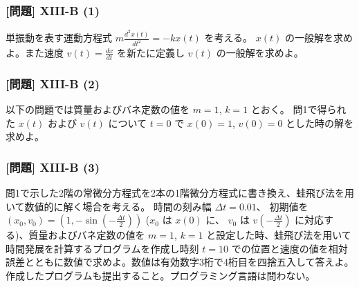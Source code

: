 \documentclass[dvipdfmx,aspectratio=169,20pt]{beamer}
\newcommand{\myfontsetting}[3]{{\fontsize{#1}{#2}\selectfont #3}}
\begin{document}
\graphicspath{{figs/}}

\begin{frame}
\frametitle{[問題] X\hspace{-.1em}I\hspace{-.1em}I\hspace{-.1em}I-B (1)}
\myfontsetting{18pt}{18pt}{
単振動を表す運動方程式 $m\frac{d^2 x(t)}{dt^2}= - k x(t)$ を考える。
$x(t)$ の一般解を求めよ。また速度 $v(t)=\frac{dx}{dt}$ を新たに定義し $v(t)$ の一般解を求めよ。
}
\end{frame}
\begin{frame}
\frametitle{[問題] X\hspace{-.1em}I\hspace{-.1em}I\hspace{-.1em}I-B (2)}
\myfontsetting{18pt}{18pt}{
以下の問題では質量およびバネ定数の値を $m=1$, $k=1$ とおく。
問1で得られた $x(t)$ および $v(t)$ について $t=0$ で $x(0)=1$, $v(0)=0$ とした時の解を求めよ。
}
\end{frame}
\begin{frame}
\frametitle{[問題] X\hspace{-.1em}I\hspace{-.1em}I\hspace{-.1em}I-B (3)}
\myfontsetting{13pt}{15pt}{
問1で示した2階の常微分方程式を2本の1階微分方程式に書き換え、蛙飛び法を用いて数値的に解く場合を考える。
時間の刻み幅 $\varDelta t=0.01$、 初期値を $(x_0,v_0)=(1,- \sin \left(- \frac{\varDelta t}{2}\right) )$ ($x_0$ は $x(0)$ に、 $v_0$ は $v\left(- \frac{\varDelta t}{2}\right)$ に対応する)、質量およびバネ定数の値を $m=1$, $k=1$ と設定した時、蛙飛び法を用いて時間発展を計算するプログラムを作成し時刻 $t=10$ での位置と速度の値を相対誤差とともに数値で求めよ。数値は有効数字3桁で4桁目を四捨五入して答えよ。
}\\
\myfontsetting{12pt}{12pt}{
作成したプログラムも提出すること。プログラミング言語は問わない。
}
\end{frame}
\end{document}
